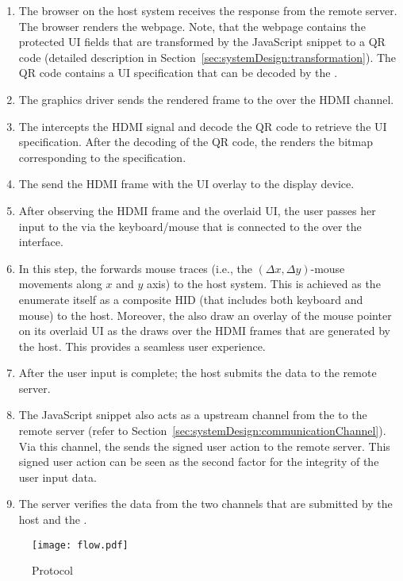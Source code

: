\begin{enumerate}
  \item[\one] The browser on the host system receives the response from the remote server. The browser renders the webpage. Note, that the webpage contains the protected UI fields that are transformed by the \name JavaScript snippet to a QR code (detailed description in Section~\ref{sec:systemDesign:transformation}). The QR code contains a UI specification that can be decoded by the \device.
  \item[\two] The graphics driver sends the rendered frame to the \device over the HDMI channel.
  \item[\three] The \device intercepts the HDMI signal and decode the QR code to retrieve the UI specification. After the decoding of the QR code, the \device renders the bitmap corresponding to the specification.
  \item[\four] The \device send the HDMI frame with the UI overlay to the display device.
  \item[\five] After observing the HDMI frame and the overlaid UI, the user passes her input to the \device via the keyboard/mouse that is connected to the \device over the \usb interface.
  \item[\six] In this step, the \device forwards mouse traces (i.e., the $(\Delta x,\Delta y)$-mouse movements along $x$ and $y$ axis) to the host system. This is achieved as the \device enumerate itself as a composite HID (that includes both keyboard and mouse) to the host. Moreover, the \device also draw an overlay of the mouse pointer on its overlaid UI as the \device draws over the HDMI frames that are generated by the host. This provides a seamless user experience.
  \item[\seven] After the user input is complete; the host submits the data to the remote server.
  \item[\eight] The \name JavaScript snippet also acts as a upstream channel from the \device to the remote server (refer to Section~\ref{sec:systemDesign:communicationChannel}). Via this channel, the \device sends the signed user action to the remote server. This signed user action can be seen as the second factor for the integrity of the user input data.
  \item [\nine] The server verifies the data from the two channels that are submitted by the host and the \device. 
\end{enumerate}



\begin{figure}[t]
\centering
\texttt{[image: flow.pdf]}
\caption{Protocol}
\label{fig:protocol}
\end{figure}




